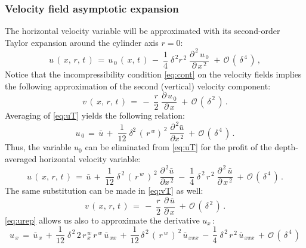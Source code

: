 \documentclass[alpha-refs, 12pt]{wiley-article}
\renewcommand{\O}{\mathcal{O}}
\begin{document}
\subsubsection{Velocity field asymptotic expansion}

The horizontal velocity variable will be approximated with its second-order Taylor expansion around the cylinder axis $r = 0$:
\begin{equation}\label{eq:uT}
  u\,(\,x,\,r,\,t\,)\,=\, u_{\,0}\,(\,x,\,t\,)\,-\;\frac{1}{4}\;\delta^{\,2}r^{\,2}\;\frac{\partial^{\,2}\,u_{\,0}}{\partial\,x^{\,2}}\; +\, \O\,(\,\delta^{\,4}\,)\,,
\end{equation}
Notice that the incompressibility condition \eqref{eq:cont} on the velocity fields implies the following approximation of the second (vertical) velocity component:
\begin{equation}\label{eq:vT}
  v\,(\,x,\,r,\,t\,)\,=\,-\;\frac{r}{2}\;\frac{\partial\, u_{\,0}}{\partial\,x}\; + \,\O\,(\,\delta^{\,2}\,)\,.
\end{equation}
Averaging of \cref{eq:uT} yields the following relation:
\begin{equation*}
  u_{\,0}\,=\,\bar{u}\,+\;\frac{1}{12}\;\delta^{2}\,(\,r^{\,w})^{\,2}\;\frac{\partial^{\,2}\bar{u}}{\partial x^{\,2}}\; + \,\O\,(\,\delta^{\,4}\,)\,.
\end{equation*}
Thus, the variable $u_0$ can be eliminated from \cref{eq:uT} for the profit of the depth-averaged horizontal velocity variable:
\begin{equation}\label{eq:urep}
  u\,(\,x,\,r,\,t\,)\,=\, \bar{u}\,+\;\frac{1}{12}\;\delta^{\,2}\,(\,r^{\,w}\,)^{\,2}\;\frac{\partial^{\,2}\bar{u}}{\partial x^{\,2}}\;-\;\frac{1}{4}\;\delta^{\,2}\,r^{\,2}\;\frac{\partial^{\,2}\,\bar{u}}{\partial\,x^{\,2}}\; + \,\O\,(\,\delta^{\,4}\,)\,.
\end{equation}
The same substitution can be made in \cref{eq:vT} as well:
\begin{equation}\label{eq:vTb}
  v\,(\,x,\,r,\,t\,)\,=\,- \;\frac{r}{2}\; \frac{\partial\,
\bar{u}}{\partial\,x}\; + \,\O\,(\,\delta^{\,2}\,)\,.
\end{equation}
\cref{eq:urep} allows us also to approximate the derivative $u_x\,$:
\begin{equation*}
  u_{\,x}\,=\,\bar{u}_{\,x}\,+\,\frac{1}{12}\;\delta^{\,2}\,2\,r^{\,w}_{\,x}\,r^{\,w}\,\bar{u}_{\,xx}\,+\,\frac{1}{12}\,\delta^{\,2}\,(\,r^{\,w}\,)^{\,2}\,\bar{u}_{\,xxx}\,-\,\frac{1}{4}\;\delta^{\,2}\,r^{\,2}\,\bar{u}_{\,xxx}\,+\,\O\,(\,\delta^{\,4}\,)
\end{equation*}
\end{document}
